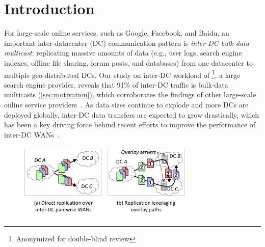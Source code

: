 \section{Introduction}

For large-scale online services, such as Google, Facebook, and
Baidu, an important inter-datacenter (DC) communication pattern is
{\em inter-DC bulk-data multicast}: replicating massive amounts of data
(e.g., user logs, search engine indexes, offline file sharing,
forum posts, and databases)
from one datacenter to multiple geo-distributed DCs.
Our study on inter-DC workload of \company\footnote{Anonymized for
double-blind review}, a large search engine provider, reveals that
91\% of inter-DC traffic is bulk-data multicasts
(\Section\ref{sec:motivation}), which corroborates the findings of
other large-scale online service providers~\cite{kumar2015bwe,zhang2016piebridge}.
As data sizes continue to explode and more DCs are deployed
globally, inter-DC data transfers are expected
to grow drastically, which has been a key driving force behind
recent efforts to improve the performance of inter-DC
WANs~\cite{savage1999Theend,jain2013b4,kumar2015bwe,hong2013achieving,zhang2015guarantee}.




\begin{figure}[t!]
\includegraphics[width=83mm]{images/intro-example.pdf}
\vspace{-0.4cm}
\label{fig:intro}
\vspace{-0.4cm}
\end{figure}

